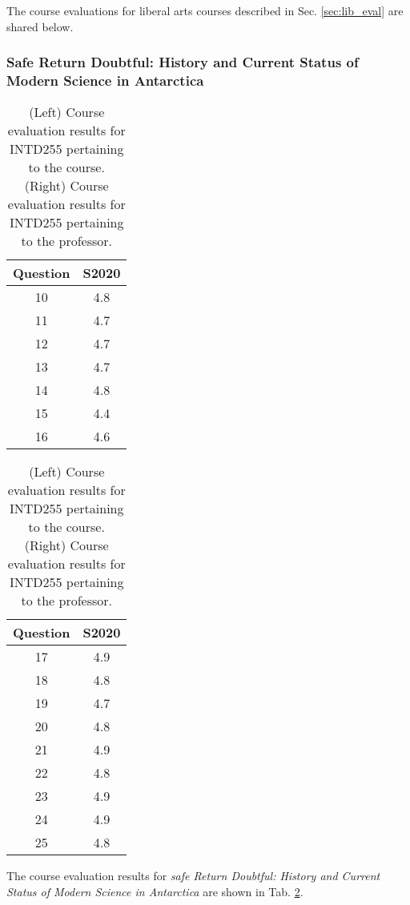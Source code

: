 \documentclass[../../../main.tex]{subfiles}
\begin{document}
The course evaluations for liberal arts courses described in Sec. \ref{sec:lib_eval} are shared below.

\subsubsection{Safe Return Doubtful: History and Current Status of Modern Science in Antarctica}

\begin{table}
\footnotesize
\centering
\begin{tabular}{| c | c |}
\hline
\hline
Question & S2020 \\ \hline
10 & 4.8 \\ \hline
11 & 4.7 \\ \hline
12 & 4.7 \\ \hline
13 & 4.7 \\ \hline
14 & 4.8 \\ \hline
15 & 4.4 \\ \hline
16 & 4.6 \\ \hline
\hline
\end{tabular}
\begin{tabular}{| c | c |}
\hline
\hline
Question & S2020 \\ \hline
17 & 4.9 \\ \hline
18 & 4.8 \\ \hline
19 & 4.7 \\ \hline
20 & 4.8 \\ \hline
21 & 4.9 \\ \hline
22 & 4.8 \\ \hline
23 & 4.9 \\ \hline
24 & 4.9 \\ \hline
25 & 4.8 \\ \hline
\hline
\end{tabular}
\caption{\label{tab:eval_255} (Left) Course evaluation results for INTD255 pertaining to the course.  (Right) Course evaluation results for INTD255 pertaining to the professor.}
\end{table}

The course evaluation results for \textit{safe Return Doubtful: History and Current Status of Modern Science in Antarctica} are shown in Tab. \ref{tab:eval_255}.
\end{document}

